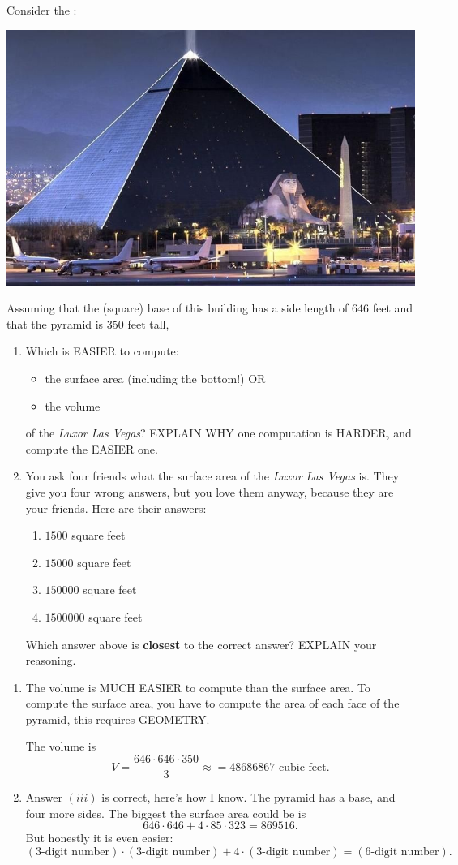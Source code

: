 \documentclass[nooutcomes,noauthor,handout,hints]{ximera}
\begin{document}
\begin{question}
  Consider the :
  \begin{center}
    \includegraphics[width=.4\textwidth]{pyramid.jpg} 
  \end{center}
 Assuming that the (square) base of this building has a side length of
 $646$ feet and that the pyramid is $350$ feet tall,
  \begin{enumerate}
  \item Which is EASIER to compute:
    \begin{itemize}
    \item the surface area (including the bottom!) OR
    \item the volume
    \end{itemize}
    of the \textit{Luxor Las Vegas}? EXPLAIN WHY one computation is
    HARDER, and compute the EASIER one.
  \item You ask four friends what the surface area of the
    \textit{Luxor Las Vegas} is. They give you four wrong answers, but
    you love them anyway, because they are your friends. Here are
    their answers:
    \begin{enumerate}
    \item $1500$ square feet
    \item $15000$ square feet
    \item $150000$ square feet
    \item $1500000$ square feet
    \end{enumerate}
    Which answer above is \textbf{closest} to the correct answer? EXPLAIN your reasoning.
  \end{enumerate}
  \begin{freeResponse}
    \begin{enumerate}
      \item The volume is MUCH EASIER to compute than the surface
        area. To compute the surface area, you have to compute the
        area of each face of the pyramid, this requires GEOMETRY.

        The volume is
        \[
        V = \frac{646\cdot 646\cdot 350}{3} \approx = 48686867 \text{ cubic feet}.
        \]
      \item Answer $(iii)$ is correct, here's how I know. The pyramid
        has a base, and four more sides. The biggest the surface area could be is
        \[
        646\cdot 646+ 4\cdot 85\cdot 323 = 869516.
        \]
        But honestly it is even easier:
        \[
        (\text{3-digit number}) \cdot (\text{3-digit number}) + 4\cdot
        (\text{3-digit number}) = (\text{6-digit number}).
        \]
    \end{enumerate}
  \end{freeResponse}
\end{question}
\mynewpage
\end{document}
